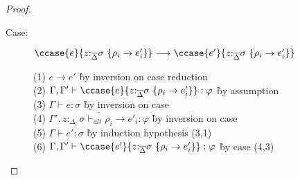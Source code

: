 \begin{proof}
\begin{description}
\item[Case:] $\ccase{e}{z{:}_{\overline{\Delta}}\sigma~\{\rho_i\to e'_i\}} \longrightarrow \ccase{e'}{z{:}_{\overline{\Delta}}\sigma~\{\rho_i\to e'_i\}}$
\begin{tabbing}
(1) $e \longrightarrow e'$ \` by inversion on case reduction \\
(2) $\Gamma, \Gamma' \vdash \ccase{e}{z{:}_{\overline{\Delta}}\sigma~\{\rho_i\to e'_i\}} : \varphi$ \` by assumption \\
(3) $\Gamma \vdash e : \sigma$ \` by inversion on case \\
(4) $\overline{\Gamma', z{:}_{\Delta_i}\sigma \vdash_{alt} \rho_i \to e'_i : \varphi}$ \` by inversion on case \\
(5) $\Gamma \vdash e' : \sigma$ \` by induction hypothesis (3,1) \\
(6) $\Gamma, \Gamma' \vdash \ccase{e'}{z{:}_{\overline{\Delta}}\sigma~\{\rho_i\to e'_i\}} : \varphi$ \` by case (4,3) \\
\end{tabbing}

\end{description}

\end{proof}

